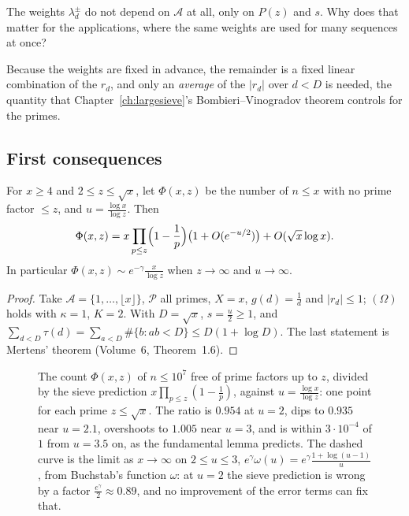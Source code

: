 \begin{think}
The weights $\lambda^\pm_d$ do not depend on $\mathcal A$ at all, only on $P(z)$ and $s$. Why does that matter for the applications, where the same weights are used for many sequences at once?
\end{think}

Because the weights are fixed in advance, the remainder is a fixed linear combination of the $r_d$, and only an \emph{average} of the $|r_d|$ over $d<D$ is needed, the quantity that Chapter~\ref{ch:largesieve}'s Bombieri--Vinogradov theorem controls for the primes.

\subsection*{First consequences}

\begin{corollary}\label{cor:rough}
For $x\ge4$ and $2\le z\le\sqrt x$, let $\Phi(x,z)$ be the number of $n\le x$ with no prime factor $\le z$, and $u=\frac{\log x}{\log z}$. Then
\[
\Phi(x,z)=x\prod_{p\le z}\Bigl(1-\frac1p\Bigr)\bigl(1+O(e^{-u/2})\bigr)+O(\sqrt x\log x).
\]
In particular $\Phi(x,z)\sim e^{-\gamma}\frac x{\log z}$ when $z\to\infty$ and $u\to\infty$.
\end{corollary}
\begin{proof}
Take $\mathcal A=\{1,\dots,\lfloor x\rfloor\}$, $\mathcal P$ all primes, $X=x$, $g(d)=\frac1d$ and $|r_d|\le1$; $(\Omega)$ holds with $\kappa=1$, $K=2$. With $D=\sqrt x$, $s=\frac u2\ge1$, and $\sum_{d<D}\tau(d)=\sum_{a<D}\#\{b:ab<D\}\le D(1+\log D)$. The last statement is Mertens' theorem (Volume~6, Theorem~1.6).
\end{proof}

\begin{figure}[ht]
\centering
{}
\caption{The count $\Phi(x,z)$ of $n\le10^7$ free of prime factors up to $z$, divided by the sieve prediction $x\prod_{p\le z}(1-\frac1p)$, against $u=\frac{\log x}{\log z}$: one point for each prime $z\le\sqrt x$. The ratio is $0.954$ at $u=2$, dips to $0.935$ near $u=2.1$, overshoots to $1.005$ near $u=3$, and is within $3\cdot10^{-4}$ of $1$ from $u=3.5$ on, as the fundamental lemma predicts. The dashed curve is the limit as $x\to\infty$ on $2\le u\le3$, $e^\gamma\omega(u)=e^\gamma\frac{1+\log(u-1)}u$, from Buchstab's function $\omega$: at $u=2$ the sieve prediction is wrong by a factor $\frac{e^\gamma}2\approx0.89$, and no improvement of the error terms can fix that.}
\label{fig:rough}
\end{figure}

